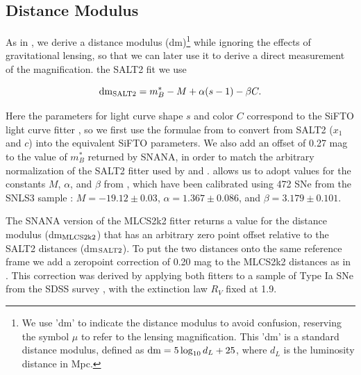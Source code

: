 \subsection{Distance Modulus}
\label{sec:DistanceModulus}

As in \citealt{Patel:2014}, we derive a distance modulus (dm)\footnote{We use 'dm' to
indicate the distance modulus to avoid confusion, reserving the symbol
$\mu$ to refer to the lensing magnification. This 'dm' is a standard
distance modulus, defined as ${\rm dm}=5\log_{10}d_L+25$, where $d_L$
is the luminosity distance in Mpc.} while ignoring the
effects of gravitational lensing, so that we can later use it to
derive a direct measurement of the magnification.   the SALT2 fit
we use

\begin{equation} \label{eqn:dmSALT2}
 {\rm dm}_{\rm SALT2} = m_B^* - M + \alpha(s-1) - \beta C.
\end{equation}

\noindent  Here the parameters for light curve shape $s$ and color $C$ 
correspond to the SiFTO light curve fitter \citep{Conley:2008}, so we
first use the formulae from \citet{Guy:2010} to convert from SALT2
($x_1$ and $c$) into the equivalent SiFTO parameters.  We also add an
offset of 0.27 mag to the value of $m_B^*$ returned by SNANA, in order
to match the arbitrary normalization of the SALT2 fitter used
by \citet{Guy:2010} and \citet{Sullivan:2011}.   allows
us to adopt values for the constants $M$, $\alpha$, and $\beta$
from \citet{Sullivan:2011}, which have been calibrated using 472 SNe
from the SNLS3 sample \citep{Conley:2011}: $M=-19.12\pm0.03$,
$\alpha=1.367\pm0.086$, and $\beta=3.179\pm0.101$.



The SNANA version of the MLCS2k2 fitter returns a value for the
distance modulus (dm$_{\rm MLCS2k2}$) that has an arbitrary zero point
offset relative to the SALT2 distances (dm$_{\rm SALT2}$).  To put the
two distances onto the same reference frame we add a zeropoint
correction of 0.20 mag to the MLCS2k2 distances as
in \citealt{Patel:2014}.  This correction was derived by applying both
fitters to a sample of Type Ia SNe from the SDSS
survey \citep{Holtzman:2008,Kessler:2009b}, with the extinction law
$R_V$ fixed at 1.9.



